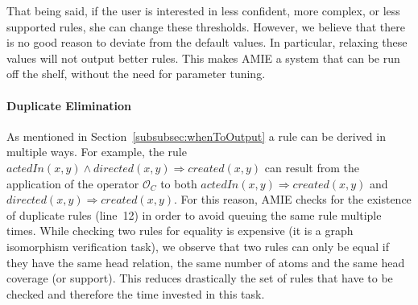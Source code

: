 
That being said, if the user is interested in less confident, more complex, or less supported rules,
she can change these thresholds. However, we believe that there is no good reason to deviate from the default values.
In particular, relaxing these values will not output better rules. This makes AMIE a system that can be run off the shelf,
without the need for parameter tuning.

\paragraph{Duplicate Elimination} \label{subsec:duplicateElimination}
As mentioned in Section~\ref{subsubsec:whenToOutput} a rule can be derived in multiple ways.
For example, the rule $actedIn(x,y) \wedge directed(x,y) \Rightarrow created(x,y)$ can result from the application
of the operator $\mathcal{O}_C$ to both $actedIn(x,y) \Rightarrow created(x,y)$ and $directed(x,y) \Rightarrow created(x,y)$.
For this reason, AMIE checks for the existence of duplicate rules (line~12) in order to avoid queuing the same rule multiple times.
While checking two rules for equality is expensive (it is a graph isomorphism verification task),
we observe that two rules can only be equal if they have the same head relation, the same number of atoms and
the same head coverage (or support). This reduces drastically the set of rules that have to be checked and therefore
the time invested in this task.


